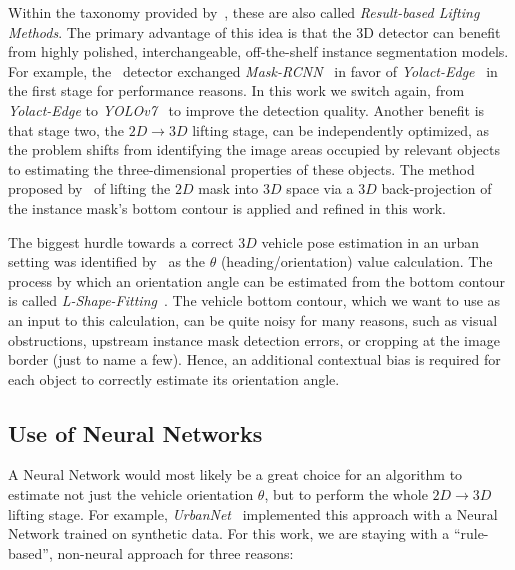 Within the taxonomy provided by~\cite{survey2022}, these are also called \textit{Result-based Lifting Methods}.
The primary advantage of this idea is that the 3D detector can benefit from highly polished, interchangeable, off-the-shelf instance segmentation models.
For example, the~\cite{leonthesis} detector exchanged \textit{Mask-RCNN}~\cite{he2017mask} in favor of \textit{Yolact-Edge}~\cite{liu2021yolactedge} in the first stage for performance reasons.
In this work we switch again, from \textit{Yolact-Edge} to \textit{YOLOv7}~\cite{wang2022yolov7} to improve the detection quality.
Another benefit is that stage two, the $2D \rightarrow 3D$ lifting stage, can be independently optimized, as the problem shifts from identifying the image areas occupied by relevant objects to estimating the three-dimensional properties of these objects.
The method proposed by~\cite{leonthesis} of lifting the $2D$ mask into $3D$ space via a $3D$ back-projection of the instance mask's bottom contour is applied and refined in this work.

The biggest hurdle towards a correct $3D$ vehicle pose estimation in an urban setting was identified by~\cite{leonthesis} as the $\theta$ (heading/orientation) value calculation.
The process by which an orientation angle can be estimated from the bottom contour is called \textit{L-Shape-Fitting}~\cite{zhang2017efficient}.
The vehicle bottom contour, which we want to use as an input to this calculation, can be quite noisy for many reasons, such as visual obstructions, upstream instance mask detection errors, or cropping at the image border (just to name a few).
Hence, an additional contextual bias is required for each object to correctly estimate its orientation angle.

\subsection{Use of Neural Networks}
\label{subsec:neural}

A Neural Network would most likely be a great choice for an algorithm to estimate not just the vehicle orientation $\theta$, but to perform the whole $2D \rightarrow 3D$ lifting stage.
For example, \textit{UrbanNet}~\cite{carrillo2021urbannet} implemented this approach with a Neural Network trained on synthetic data.
For this work, we are staying with a \enquote{rule-based}, non-neural approach for three reasons:

